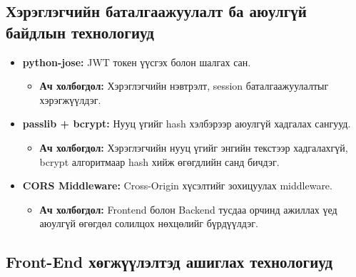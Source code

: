 \subsection{Хэрэглэгчийн баталгаажуулалт ба аюулгүй байдлын технологиуд}

\begin{itemize}

    \item \textbf{python-jose:} JWT токен үүсгэх болон шалгах сан.
    \begin{itemize}
        \item \textbf{Ач холбогдол:} Хэрэглэгчийн нэвтрэлт, session баталгаажуулалтыг хэрэгжүүлдэг.
    \end{itemize}

    \item \textbf{passlib + bcrypt:} Нууц үгийг hash хэлбэрээр аюулгүй хадгалах сангууд.
    \begin{itemize}
        \item \textbf{Ач холбогдол:} Хэрэглэгчийн нууц үгийг энгийн текстээр хадгалахгүй, bcrypt алгоритмаар hash хийж өгөгдлийн санд бичдэг.
    \end{itemize}

    \item \textbf{CORS Middleware:} Cross-Origin хүсэлтийг зохицуулах middleware.
    \begin{itemize}
        \item \textbf{Ач холбогдол:} Frontend болон Backend тусдаа орчинд ажиллах үед аюулгүй өгөгдөл солилцох нөхцөлийг бүрдүүлдэг.
    \end{itemize}

\end{itemize}

\subsection{Front-End хөгжүүлэлтэд ашиглах технологиуд}

